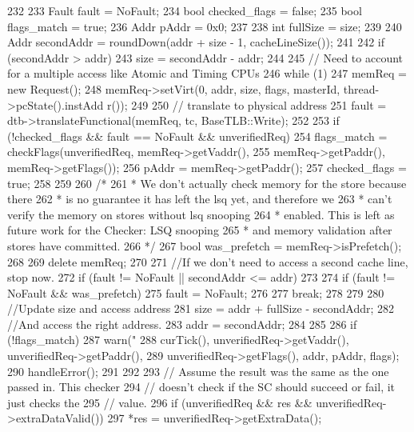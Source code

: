\begin{DoxyCode}
232 {
233     Fault fault = NoFault;
234     bool checked_flags = false;
235     bool flags_match = true;
236     Addr pAddr = 0x0;
237 
238     int fullSize = size;
239 
240     Addr secondAddr = roundDown(addr + size - 1, cacheLineSize());
241 
242     if (secondAddr > addr)
243         size = secondAddr - addr;
244 
245     // Need to account for a multiple access like Atomic and Timing CPUs
246     while (1) {
247         memReq = new Request();
248         memReq->setVirt(0, addr, size, flags, masterId, thread->pcState().instAdd
      r());
249 
250         // translate to physical address
251         fault = dtb->translateFunctional(memReq, tc, BaseTLB::Write);
252 
253         if (!checked_flags && fault == NoFault && unverifiedReq) {
254            flags_match = checkFlags(unverifiedReq, memReq->getVaddr(),
255                                     memReq->getPaddr(), memReq->getFlags());
256            pAddr = memReq->getPaddr();
257            checked_flags = true;
258         }
259 
260         /*
261          * We don't actually check memory for the store because there
262          * is no guarantee it has left the lsq yet, and therefore we
263          * can't verify the memory on stores without lsq snooping
264          * enabled.  This is left as future work for the Checker: LSQ snooping
265          * and memory validation after stores have committed.
266          */
267         bool was_prefetch = memReq->isPrefetch();
268 
269         delete memReq;
270 
271         //If we don't need to access a second cache line, stop now.
272         if (fault != NoFault || secondAddr <= addr)
273         {
274             if (fault != NoFault && was_prefetch) {
275               fault = NoFault;
276             }
277             break;
278         }
279 
280         //Update size and access address
281         size = addr + fullSize - secondAddr;
282         //And access the right address.
283         addr = secondAddr;
284    }
285 
286    if (!flags_match) {
287        warn("%
288             curTick(), unverifiedReq->getVaddr(), unverifiedReq->getPaddr(),
289             unverifiedReq->getFlags(), addr, pAddr, flags);
290        handleError();
291    }
292 
293    // Assume the result was the same as the one passed in.  This checker
294    // doesn't check if the SC should succeed or fail, it just checks the
295    // value.
296    if (unverifiedReq && res && unverifiedReq->extraDataValid())
297        *res = unverifiedReq->getExtraData();
}
\end{DoxyCode}
